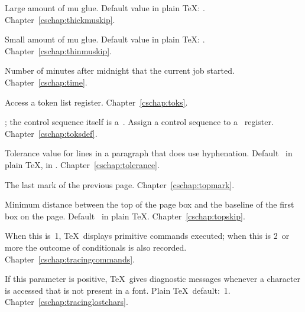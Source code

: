 \begin{glossinventory}
\item [\cs{thickmuskip}]
      Large amount of mu glue. 
      Default value in plain \TeX: .
Chapter~\ref{cschap:thickmuskip}.

\item [\cs{thinmuskip}]
      Small amount of mu glue.
      Default value in plain \TeX: \n{3mu}.
Chapter~\ref{cschap:thinmuskip}.

\item [\cs{time}]
      Number of minutes after midnight that the current job started.
Chapter~\ref{cschap:time}.

\item [\cs{toks\gr{8-bit number}}]
      Access a token list register.
Chapter~\ref{cschap:toks}.

\item [\cs{toksdef\gr{control sequence}\gr{equals}\gr{8-bit number}}]
      ; the control sequence
      itself is a~.
      Assign a control sequence to
      a~ register.
Chapter~\ref{cschap:toksdef}.

\item [\cs{tolerance}]
      Tolerance value for lines in a paragraph that does use hyphenation. 
      Default~ in plain \TeX,  in \IniTeX.
Chapter~\ref{cschap:tolerance}.

\item [\cs{topmark}]
      The last mark of the previous page.
Chapter~\ref{cschap:topmark}.

\item [\cs{topskip}]
      Minimum distance between the top of the page box
      and the baseline of the first box on the page. 
      Default~\n{10pt} in plain \TeX.
Chapter~\ref{cschap:topskip}.

\item [\cs{tracingcommands}]
      When this is~1, \TeX\ displays primitive commands executed; 
      when this is 2~or more the outcome of conditionals is also recorded.
Chapter~\ref{cschap:tracingcommands}.

\item [\cs{tracinglostchars}]
      If this parameter is positive, \TeX\ gives      
      diagnostic messages whenever a character is accessed that      
      is not present in a font. Plain \TeX\ default:~1.
Chapter~\ref{cschap:tracinglostchars}.


\end{glossinventory}
